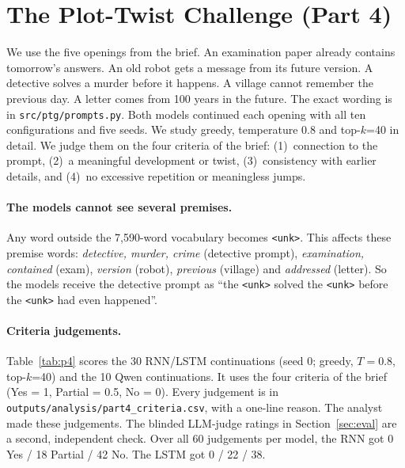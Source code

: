 \documentclass[11pt,a4paper]{article}
\begin{document}
\begin{table}[H]\centering
\caption{Held-out termination test: the first sentence of each of 100 test stories is the prompt;
we generate up to 600 tokens (seed 0). Real = the remaining length of the actual story. Too long =
no \texttt{<eos>} or more than $2\times$ the real length.}\label{tab:length}
{\small}
\end{table}

\section{The Plot-Twist Challenge (Part 4)}
\label{sec:twist}
We use the five openings from the brief. An examination paper already contains tomorrow's
answers. An old robot gets a message from its future version. A detective solves a murder
before it happens. A village cannot remember the previous day. A letter comes from 100 years
in the future. The exact wording is in \texttt{src/ptg/prompts.py}. Both models continued each
opening with all ten configurations and five seeds. We study greedy, temperature 0.8 and
top-$k$=40 in detail. We judge them on the four criteria of the brief: (1)~connection to the
prompt, (2)~a meaningful development or twist, (3)~consistency with earlier details, and (4)~no
excessive repetition or meaningless jumps.

\paragraph{The models cannot see several premises.} Any word outside the 7,590-word vocabulary
becomes \texttt{<unk>}. This affects these premise words: \emph{detective, murder, crime}
(detective prompt), \emph{examination, contained} (exam), \emph{version} (robot), \emph{previous}
(village) and \emph{addressed} (letter). So the models receive the detective prompt as ``the
\texttt{<unk>} solved the \texttt{<unk>} before the \texttt{<unk>} had even happened''.

\paragraph{Criteria judgements.} Table~\ref{tab:p4} scores the 30 RNN/LSTM continuations (seed 0;
greedy, $T=0.8$, top-$k$=40) and the 10 Qwen continuations. It uses the four criteria of the brief
(Yes = 1, Partial = 0.5, No = 0). Every judgement is in
\texttt{outputs/analysis/part4\_criteria.csv}, with a one-line reason. The analyst made these
judgements. The blinded LLM-judge ratings in Section~\ref{sec:eval} are a second, independent
check. Over all 60 judgements per model, the RNN got 0 Yes / 18 Partial / 42 No. The LSTM got
0 / 22 / 38.
\end{document}
